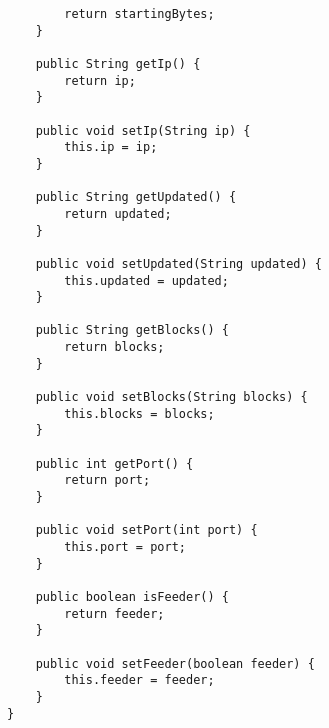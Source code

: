 \documentclass{acm_proc_article-sp}
\begin{document}
\begin{lstlisting}
        return startingBytes;
    }

    public String getIp() {
        return ip;
    }

    public void setIp(String ip) {
        this.ip = ip;
    }

    public String getUpdated() {
        return updated;
    }

    public void setUpdated(String updated) {
        this.updated = updated;
    }

    public String getBlocks() {
        return blocks;
    }

    public void setBlocks(String blocks) {
        this.blocks = blocks;
    }

    public int getPort() {
        return port;
    }

    public void setPort(int port) {
        this.port = port;
    }

    public boolean isFeeder() {
        return feeder;
    }

    public void setFeeder(boolean feeder) {
        this.feeder = feeder;
    }
}
\end{lstlisting}
\end{document}
